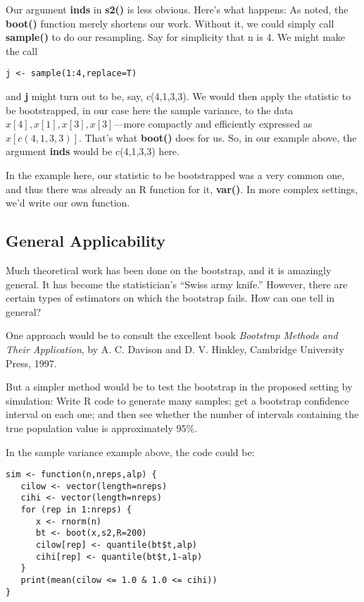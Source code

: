 Our argument {\bf inds} in {\bf s2()} is less obvious.  Here's what
happens:  As noted, the {\bf boot()} function merely shortens our work.
Without it, we could simply call {\bf sample()} to do our resampling.
Say for simplicity that n is 4.  We might make the call

\begin{Verbatim}[fontsize=\relsize{-2}]
j <- sample(1:4,replace=T)
\end{Verbatim}

and {\bf j} might turn out to be, say, c(4,1,3,3).  We would then apply
the statistic to be bootstrapped, in our case here the sample variance,
to the data $x[4], x[1], x[3], x[3]$---more compactly and efficiently
expressed as $x[c(4,1,3,3)]$.  That's what {\bf boot()} does for us.
So, in our example above, the argument {\bf inds} would be c(4,1,3,3)
here.

In the example here, our statistic to be bootstrapped was a very common
one, and thus there was already an R function for it, {\bf var()}.  In
more complex settings, we'd write our own function.  

\subsection{General Applicability}

Much theoretical work has been done on the bootstrap, and it is
amazingly general.  It has become the statistician's ``Swiss army
knife.''  However, there are certain types of estimators on which the
bootstrap fails.  How can one tell in general?

One approach would be to consult the excellent book {\it Bootstrap
Methods and Their Application}, by A. C. Davison and D. V. Hinkley, 
Cambridge University Press, 1997.

But a simpler method would be to test the bootstrap in the proposed
setting by simulation:  Write R code to generate many samples; get a
bootstrap confidence interval on each one; and then see whether the
number of intervals containing the true population value is
approximately 95\%.

In the sample variance example above, the code could be:

\begin{Verbatim}[fontsize=\relsize{-2}]
sim <- function(n,nreps,alp) {
   cilow <- vector(length=nreps)
   cihi <- vector(length=nreps)
   for (rep in 1:nreps) {
      x <- rnorm(n)
      bt <- boot(x,s2,R=200)
      cilow[rep] <- quantile(bt$t,alp)
      cihi[rep] <- quantile(bt$t,1-alp)
   }
   print(mean(cilow <= 1.0 & 1.0 <= cihi))
}
\end{Verbatim}

